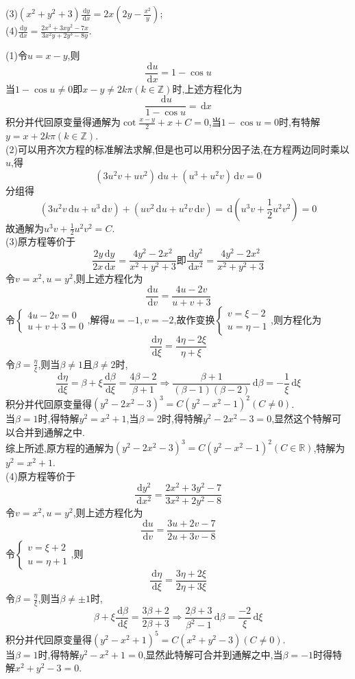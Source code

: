 \documentclass[titlepage,11pt,a4paper,twoside]{report}
\makeatletter
\newcommand\diff{\,\mathrm{d}}
\newenvironment{solve}{\par
	\pushQED{\qed}%
	\normalfont \topsep1\p@\@plus6\p@\relax
	\trivlist
	\item\relax
	{\hspace*{\parindent}{\heiti 解}\@addpunct{:}}\hspace\labelsep\ignorespaces
}{%
	\popQED\endtrivlist\@endpefalse
}
\makeatother
\begin{document}
(3)$\displaystyle(x^2+y^2+3)\frac{\diff y}{\diff x}=2x\left(2y-\frac{x^2}{y}\right)$;\\
(4)$\displaystyle\frac{\diff y}{\diff x}=\frac{2x^3+3xy^2-7x}{3x^2y+2y^3-8y}$.
\begin{solve}
(1)令$u=x-y$,则
\[\frac{\diff u}{\diff x}=1-\cos u\]
当$1-\cos u\neq0$即$x-y\neq2k\pi(k\in\mathbb{Z})$时,上述方程化为
\[\frac{\diff u}{1-\cos u}=\diff x\]
积分并代回原变量得通解为$\cot\frac{x-y}{2}+x+C=0$,当$1-\cos u=0$时,有特解$y=x+2k\pi(k\in\mathbb{Z})$.\\
(2)可以用齐次方程的标准解法求解,但是也可以用积分因子法,在方程两边同时乘以$u$,得
\[(3u^2v+uv^2)\diff u+(u^3+u^2v)\diff v=0\]
分组得
\[(3u^2v\diff u+u^3\diff v)+(uv^2\diff u+u^2v\diff v)=\diff\left(u^3v+\frac{1}{2}u^2v^2\right)=0\]
故通解为$u^3v+\frac{1}{2}u^2v^2=C$.\\
(3)原方程等价于\[\frac{2y\diff y}{2x\diff x}=\frac{4y^2-2x^2}{x^2+y^2+3}\mbox{即}\frac{\diff y^2}{\diff x^2}=\frac{4y^2-2x^2}{x^2+y^2+3}\]
令$v=x^2,u=y^2$,则上述方程化为
\[\frac{\diff u}{\diff v}=\frac{4u-2v}{u+v+3}\]
令$\begin{cases}4u-2v=0\\u+v+3=0\end{cases}$,解得$u=-1,v=-2$,故作变换$\begin{cases}v=\xi-2\\u=\eta-1\end{cases}$,则方程化为
\[\frac{\diff\eta}{\diff\xi}=\frac{4\eta-2\xi}{\eta+\xi}\]
令$\beta=\frac{\eta}{\xi}$,则当$\beta\neq1$且$\beta\neq2$时,
\[\frac{\diff\eta}{\diff\xi}=\beta+\xi\frac{\diff\beta}{\diff\xi}=\frac{4\beta-2}{\beta+1}\Rightarrow\frac{\beta+1}{(\beta-1)(\beta-2)}\diff\beta=-\frac{1}{\xi}\diff\xi\]
积分并代回原变量得$\left(y^2-2x^2-3\right)^3=C\left(y^2-x^2-1\right)^2(C\neq0)$.\\
当$\beta=1$时,得特解$y^2=x^2+1$,当$\beta=2$时,得特解$y^2-2x^2-3=0$,显然这个特解可以合并到通解之中.\\
综上所述,原方程的通解为$\left(y^2-2x^2-3\right)^3=C\left(y^2-x^2-1\right)^2(C\in\mathbb{R})$,特解为$y^2=x^2+1$.\\
(4)原方程等价于
\[\frac{\diff y^2}{\diff x^2}=\frac{2x^2+3y^2-7}{3x^2+2y^2-8}\]
令$v=x^2,u=y^2$,则上述方程化为
\[\frac{\diff u}{\diff v}=\frac{3u+2v-7}{2u+3v-8}\]
令$\begin{cases}v=\xi+2\\u=\eta+1\end{cases}$,则
\[\frac{\diff\eta}{\diff\xi}=\frac{3\eta+2\xi}{2\eta+3\xi}\]
令$\beta=\frac{\eta}{\xi}$,则当$\beta\neq\pm1$时,
\[\beta+\xi\frac{\diff\beta}{\diff\xi}=\frac{3\beta+2}{2\beta+3}\Rightarrow\frac{2\beta+3}{\beta^2-1}\diff\beta=\frac{-2}{\xi}\diff\xi\]
积分并代回原变量得$(y^2-x^2+1)^5=C(x^2+y^2-3)(C\neq0)$.\\
当$\beta=1$时,得特解$y^2-x^2+1=0$,显然此特解可合并到通解之中,当$\beta=-1$时得特解$x^2+y^2-3=0$.
\end{solve}
\end{document}
